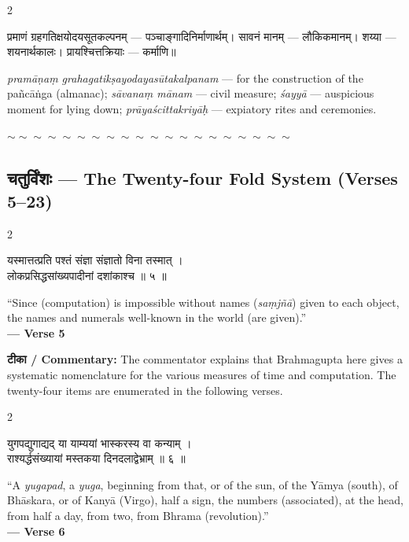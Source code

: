 \documentclass[11pt,a4paper]{article}
\newcommand{\dev}[1]{{\devanagarifont #1}}
\newenvironment{bilingualverse}{%
  \begin{paracol}{2}
  \fontsize{10.5}{13}\selectfont
}{%
  \end{paracol}
  \vspace{0.3cm}
}
\newcommand{\wavydivider}{\begin{center}$\sim\sim\sim\sim\sim\sim\sim\sim\sim\sim\sim\sim\sim\sim\sim\sim\sim\sim\sim\sim$\end{center}}
\begin{document}
\begin{paracol}{2}
\begin{leftcolumn*}
\dev{प्रमाणं ग्रहगतिक्षयोदयसूतकल्पनम्} — पञ्चाङ्गादिनिर्माणार्थम्। \dev{सावनं मानम्} — लौकिकमानम्। \dev{शय्या} — शयनार्थकालः। \dev{प्रायश्चित्तक्रियाः} — कर्माणि॥
\end{leftcolumn*}
\begin{rightcolumn}
\textit{pramāṇaṃ grahagatikṣayodayasūtakalpanam} --- for the construction of the pañcāṅga (almanac); \textit{sāvanaṃ mānam} --- civil measure; \textit{śayyā} --- auspicious moment for lying down; \textit{prāyaścittakriyāḥ} --- expiatory rites and ceremonies.
\end{rightcolumn}
\end{paracol}

\wavydivider

\subsection*{\dev{चतुर्विंशः} — The Twenty-four Fold System (Verses 5--23)}

\begin{bilingualverse}
\begin{leftcolumn*}
\dev{यस्मात्तत्प्रति पश्तं संज्ञा संज्ञातो विना तस्मात् ।}\\
\dev{लोकप्रसिद्धसांख्यपादीनां दशांकाश्च ॥ ५ ॥}
\end{leftcolumn*}
\begin{rightcolumn}
``Since (computation) is impossible without names (\textit{saṃjñā}) given to each object, the names and numerals well-known in the world (are given).''\\[0.3cm]
\hfill\textbf{— Verse 5}
\end{rightcolumn}
\end{bilingualverse}

\textbf{\dev{टीका} / Commentary:} The commentator explains that Brahmagupta here gives a systematic nomenclature for the various measures of time and computation. The twenty-four items are enumerated in the following verses.

\vspace{0.3cm}

\begin{bilingualverse}
\begin{leftcolumn*}
\dev{युगपद्युगाद्यद् या याम्ययां भास्करस्य वा कन्याम् ।}\\
\dev{राश्यर्द्धसंख्यायां मस्तकया दिनदलाद्वेभ्राम् ॥ ६ ॥}
\end{leftcolumn*}
\begin{rightcolumn}
``A \textit{yugapad}, a \textit{yuga}, beginning from that, or of the sun, of the Yāmya (south), of Bhāskara, or of Kanyā (Virgo), half a sign, the numbers (associated), at the head, from half a day, from two, from Bhrama (revolution).''\\[0.3cm]
\hfill\textbf{— Verse 6}
\end{rightcolumn}
\end{bilingualverse}
\end{document}
